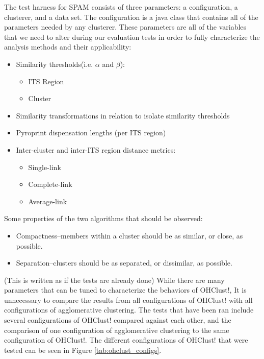 \documentclass[12pt]{ucthesis}
\begin{document}
      The test harness for SPAM consists of three parameters: a configuration,
      a clusterer, and a data set. The configuration is a java class that
      contains all of the parameters needed by any clusterer. These
      parameters are all of the variables that we need to alter during our
      evaluation tests in order to fully characterize the analysis methods and
      their applicability:
      \begin{itemize}
         \item Similarity thresholds(i.e. $\alpha$ and $\beta$):
               \begin{itemize}
                  \item ITS Region
                  \item Cluster
               \end{itemize}
         \item Similarity transformations in relation to isolate similarity
               thresholds
         \item Pyroprint dispensation lengths (per ITS region)
         \item Inter-cluster and inter-ITS region distance metrics:
               \begin{itemize}
                  \item Single-link
                  \item Complete-link
                  \item Average-link
               \end{itemize}
      \end{itemize}
      Some properties of the two algorithms that should be observed:
      \begin{itemize}
         \item Compactness--members within a cluster should be as similar, or
               close, as possible.
         \item Separation--clusters should be as separated, or dissimilar, as
               possible.
      \end{itemize}

      (This is written as if the tests are already done) While there are many
      parameters that can be tuned to characterize the behaviors of \textsf{OHClust!},
      It is unnecessary to compare the results from all configurations of
      \textsf{OHClust!} with all configurations of \textsf{agglomerative clustering}. The tests that have been
      ran include several configurations of \textsf{OHClust!} compared against each other, and the
      comparison of one configuration of \textsf{agglomerative clustering} to the same configuration
      of \textsf{OHClust!}. The different configurations of \textsf{OHClust!} that were tested
      can be seen in Figure \ref{tab:ohclust_configs}.
\end{document}
